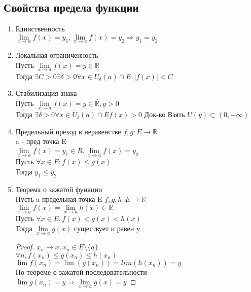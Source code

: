 \subsection{Свойства предела функции}
\begin{enumerate}
	\item Единственность \\
	$ \lim\limits_{x \rightarrow a} f(x) = y_1, \lim\limits_{x \rightarrow a} f(x) = y_2 \Rightarrow y_1 = y_2 $ \\
	\item Локальная ограниченность \\
	Пусть $  \lim\limits_{x \rightarrow a} f(x) = y \in \mathbb{R} $ \\
	Тогда $ \exists C > 0 \exists \delta > 0 \forall x \in U_{\delta} (a) \cap E : |f(x)| < C $ \\ %
	\item Стабилизация знака \\
	Пусть  $ \lim\limits_{x \rightarrow a} f(x)  = y \in \overline{\mathbb{R}}, y >0$ \\
	Тогда $ \exists \delta > 0 \forall x \in \dot{U_\delta} (a) \cap E f(x) > 0 $
	Док-во Взять $ U(y) \subset (0, +\infty) $
	\item Предельный преход в неравенстве
	$ f, g : E \rightarrow \mathbb{R}$\\
	a - пред точка E \\
	$   \lim\limits_{x \rightarrow a} f(x) = y_1 \in \overline{R},  \lim\limits_{x \rightarrow a} f(x) = y_2 $ \\
	Пусть $ \forall x \in E : f(x) \leq g(x) $\\
	Тогда $ y_1 \leq y_2 $\\ %
	\item Теорема о зажатой функции \\
	Пусть a  предельная точка E $ f,g,h : E \rightarrow \mathbb{R} $\\
	$  \lim\limits_{x \rightarrow a} f(x) =  \lim\limits_{x \rightarrow a} h(x) \in \mathbb{R} $ \\
	Пусть $ \forall x \in E, f(x) < g(x) < h(x) $ \\
	Тогда $  \lim\limits_{x \rightarrow a} g(x)  $ существует и равен y \\
	\begin{proof}
		$ x_n \rightarrow x, x_n \in E \setminus \{a\} $ \\
		$ \forall n, f(x_n) \leq g(x_n) \leq h(x_n) $ \\
		$ \lim f(x_n) = \lim(g(x_n)) = lim(h(x_n)) = y$\\
		По теореме о зажатой последовательности $ \lim g(x_n) = y \Rightarrow  \lim\limits_{x \rightarrow a} g(x) = y $ 
	\end{proof}
	
\end{enumerate}
